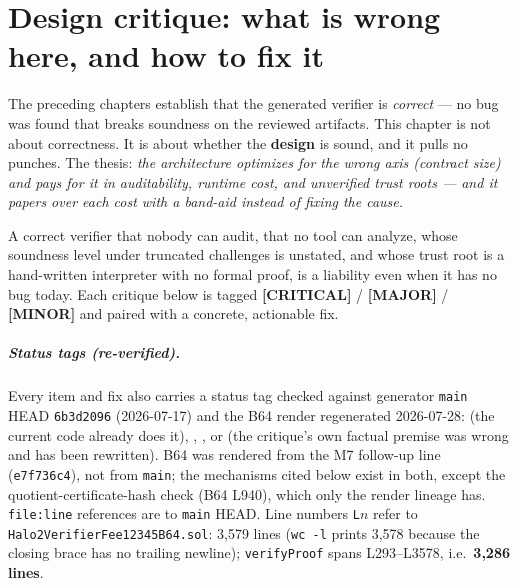 \chapter{Design critique: what is wrong here, and how to fix it}
\label{ch:critique}

The preceding chapters establish that the generated verifier is
\emph{correct} --- no bug was found that breaks soundness on the
reviewed artifacts. This chapter is not about correctness. It is
about whether the \textbf{design} is sound, and it pulls no
punches. The thesis: \emph{the architecture optimizes for the
wrong axis (contract size) and pays for it in auditability,
runtime cost, and unverified trust roots --- and it papers over
each cost with a band-aid instead of fixing the cause.}

A correct verifier that nobody can audit, that no tool can
analyze, whose soundness level under truncated challenges is unstated, and whose
trust root is a hand-written interpreter with no formal proof, is
a liability even when it has no bug today. Each critique below is
tagged \textcolor{rustorange}{\textbf{[CRITICAL]}} /
\textcolor{mathpurple}{\textbf{[MAJOR]}} /
\textcolor{codegenblue}{\textbf{[MINOR]}} and paired with a
concrete, actionable fix.

\paragraph{Status tags (re-verified).} Every item and fix also
carries a status tag checked against generator \texttt{main} HEAD
\texttt{6b3d2096} (2026-07-17) and the B64 render regenerated
2026-07-28:  (the current code already does
it), , , or 
(the critique's own factual premise was wrong and has been
rewritten). B64 was rendered from the M7 follow-up line
(\texttt{e7f736c4}), not from \texttt{main}; the mechanisms cited
below exist in both, except the quotient-certificate-hash check
(B64 L940), which only the render lineage has. \texttt{file:line}
references are to \texttt{main} HEAD. Line numbers \texttt{L}$n$ refer to
\texttt{Halo2VerifierFee12345B64.sol}: 3{,}579 lines (\texttt{wc -l}
prints 3{,}578 because the closing brace has no trailing newline);
\texttt{verifyProof} spans L293--L3578, i.e.\ \textbf{3{,}286 lines}.

